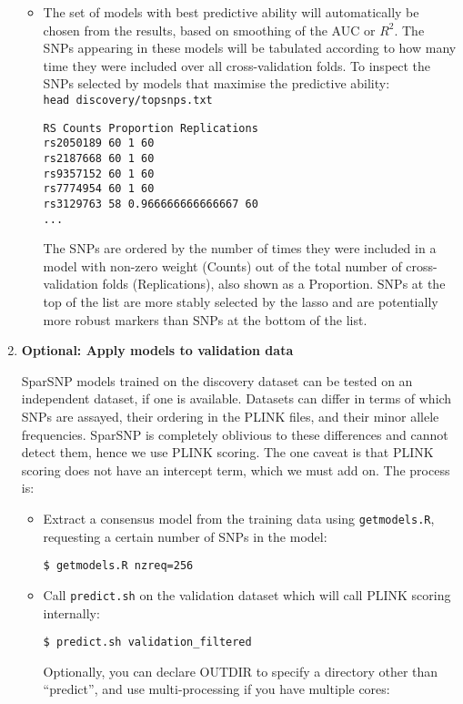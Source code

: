 \documentclass[a4paper,11pt]{article}
\begin{document}
\begin{enumerate}
\begin{itemize}
	 \item The set of models with best predictive ability will
	 automatically be chosen from the results, based on smoothing
	 of the AUC or $R^2$. The SNPs appearing in these models will be
	 tabulated according to how many time they were included over all
	 cross-validation folds. To inspect the SNPs selected by models that
	 maximise the predictive ability:\\
	 \texttt{head discovery/topsnps.txt}
	 \begin{verbatim}
RS Counts Proportion Replications
rs2050189 60 1 60
rs2187668 60 1 60
rs9357152 60 1 60
rs7774954 60 1 60
rs3129763 58 0.966666666666667 60
...
	 \end{verbatim}
	 The SNPs are ordered by the number of times they were included in a
	 model with non-zero weight (Counts) out of the total number of
	 cross-validation folds (Replications), also shown as a Proportion.
	 SNPs at the top of the list are more stably selected by the lasso and
	 are potentially more robust markers than SNPs at the bottom of the
	 list.

      \end{itemize}

   \item \textbf{Optional: Apply models to validation data}

      SparSNP models trained on the discovery dataset can be tested on an
      independent dataset, if one is available. Datasets can differ in terms
      of which SNPs are assayed, their ordering in the PLINK files, and their
      minor allele frequencies. SparSNP is completely oblivious to these
      differences and cannot detect them, hence we use PLINK scoring. The
      one caveat is that PLINK scoring does not have an intercept term, which
      we must add on. The process is:
      \begin{itemize}

	 \item Extract a consensus model from the training data using
	 \texttt{getmodels.R}, requesting a certain number of SNPs in the
	 model:

	 \texttt{\$ getmodels.R nzreq=256}

	 \item Call \texttt{predict.sh} on the validation dataset which will
	 call PLINK scoring internally:

	 \texttt{\$ predict.sh validation\_filtered}

	 Optionally, you can declare OUTDIR to specify a directory other than
	 ``predict'', and use multi-processing if you have multiple cores:


\end{itemize}
\end{enumerate}
\end{document}

